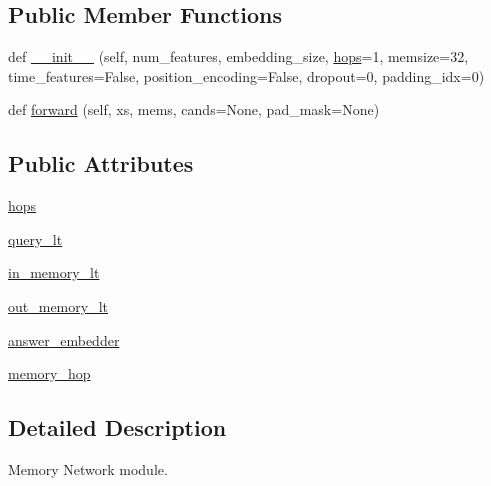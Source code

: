 \subsection*{Public Member Functions}
\begin{DoxyCompactItemize}
\item 
def \hyperlink{classparlai_1_1agents_1_1memnn_1_1modules_1_1MemNN_a8bfe18ec94ebe8fc68a4147a1ebcbcb4}{\+\_\+\+\_\+init\+\_\+\+\_\+} (self, num\+\_\+features, embedding\+\_\+size, \hyperlink{classparlai_1_1agents_1_1memnn_1_1modules_1_1MemNN_a2c29f0e03952f1a7603072a8f13d675f}{hops}=1, memsize=32, time\+\_\+features=False, position\+\_\+encoding=False, dropout=0, padding\+\_\+idx=0)
\item 
def \hyperlink{classparlai_1_1agents_1_1memnn_1_1modules_1_1MemNN_ab4402719d43be5dba7eb6a15074c0273}{forward} (self, xs, mems, cands=None, pad\+\_\+mask=None)
\end{DoxyCompactItemize}
\subsection*{Public Attributes}
\begin{DoxyCompactItemize}
\item 
\hyperlink{classparlai_1_1agents_1_1memnn_1_1modules_1_1MemNN_a2c29f0e03952f1a7603072a8f13d675f}{hops}
\item 
\hyperlink{classparlai_1_1agents_1_1memnn_1_1modules_1_1MemNN_aa6b47d1470856e76a31e266a049da848}{query\+\_\+lt}
\item 
\hyperlink{classparlai_1_1agents_1_1memnn_1_1modules_1_1MemNN_a5aa6b0e36ae580858341aea864a11caf}{in\+\_\+memory\+\_\+lt}
\item 
\hyperlink{classparlai_1_1agents_1_1memnn_1_1modules_1_1MemNN_a9eecf9c267fd2c15ba376a1bac3a9cc5}{out\+\_\+memory\+\_\+lt}
\item 
\hyperlink{classparlai_1_1agents_1_1memnn_1_1modules_1_1MemNN_ac1282441a297691b0c9287db71f381ff}{answer\+\_\+embedder}
\item 
\hyperlink{classparlai_1_1agents_1_1memnn_1_1modules_1_1MemNN_a9186fc7eb97fc4a18517928091ea7a3b}{memory\+\_\+hop}
\end{DoxyCompactItemize}


\subsection{Detailed Description}
\begin{DoxyVerb}Memory Network module.\end{DoxyVerb}
 

